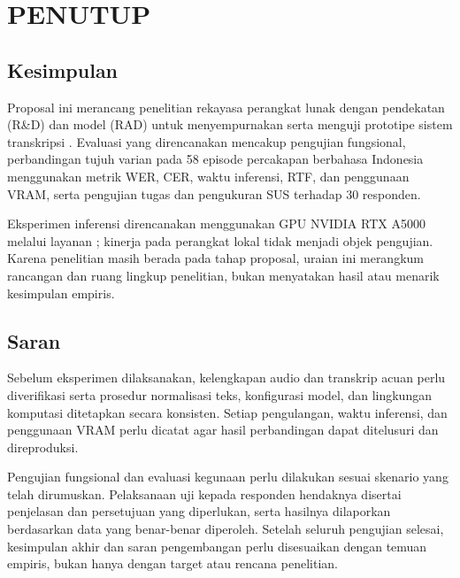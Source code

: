 \chapter{PENUTUP}

\section{Kesimpulan}
Proposal ini merancang penelitian rekayasa perangkat lunak dengan pendekatan  (R\&D) dan model  (RAD) untuk menyempurnakan serta menguji prototipe sistem transkripsi \namasistem. Evaluasi yang direncanakan mencakup pengujian fungsional, perbandingan tujuh varian  pada 58 episode percakapan berbahasa Indonesia menggunakan metrik WER, CER, waktu inferensi, RTF, dan penggunaan VRAM, serta pengujian tugas dan pengukuran SUS terhadap 30 responden.

Eksperimen inferensi direncanakan menggunakan GPU NVIDIA RTX A5000 melalui layanan ; kinerja pada perangkat lokal tidak menjadi objek pengujian. Karena penelitian masih berada pada tahap proposal, uraian ini merangkum rancangan dan ruang lingkup penelitian, bukan menyatakan hasil atau menarik kesimpulan empiris.

\section{Saran}
Sebelum eksperimen dilaksanakan, kelengkapan audio dan transkrip acuan perlu diverifikasi serta prosedur normalisasi teks, konfigurasi model, dan lingkungan komputasi ditetapkan secara konsisten. Setiap pengulangan, waktu inferensi, dan penggunaan VRAM perlu dicatat agar hasil perbandingan dapat ditelusuri dan direproduksi.

Pengujian fungsional dan evaluasi kegunaan perlu dilakukan sesuai skenario yang telah dirumuskan. Pelaksanaan uji kepada responden hendaknya disertai penjelasan dan persetujuan yang diperlukan, serta hasilnya dilaporkan berdasarkan data yang benar-benar diperoleh. Setelah seluruh pengujian selesai, kesimpulan akhir dan saran pengembangan perlu disesuaikan dengan temuan empiris, bukan hanya dengan target atau rencana penelitian.

